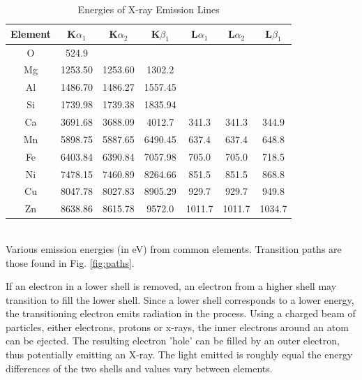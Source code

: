 \documentclass[10pt]{IEEEtran}
\begin{document}
\begin{table}[!hbt]
    \begin{center}
    \caption{Energies of X-ray Emission Lines}
    \label{tab:energies}
	\begin{tabular}{c|cccccc}
\hline 
Element & K$\alpha_1$ & K$\alpha_2$ & K$\beta_1$ & L$\alpha_1$ & L$\alpha_2$ & L$\beta_1$ \\ 
\hline 
O & 524.9 &   &  \\  
Mg & 1253.50 & 1253.60 & 1302.2 & & & \\  
Al & 1486.70 & 1486.27 & 1557.45 & & & \\  
Si & 1739.98 & 1739.38 & 1835.94 & & & \\  
Ca & 3691.68 & 3688.09 & 4012.7 & 341.3 & 341.3 & 344.9 \\ 
Mn & 5898.75 & 5887.65 & 6490.45 & 637.4 & 637.4 & 648.8 \\ 
Fe & 6403.84 & 6390.84 & 7057.98 & 705.0 & 705.0 & 718.5 \\ 
Ni & 7478.15 & 7460.89 & 8264.66 & 851.5 & 851.5 & 868.8 \\ 
Cu & 8047.78 & 8027.83 & 8905.29 & 929.7 & 929.7 & 949.8 \\ 
Zn & 8638.86 & 8615.78 & 9572.0 & 1011.7 & 1011.7 & 1034.7 \\ 
\hline
	\end{tabular}
	\medskip \\
    Various emission energies (in eV) from common elements\cite{xdb}. Transition paths are those found in Fig. \ref{fig:paths}.
	\end{center}
\end{table}

If an electron in a lower shell is removed, an electron from a higher shell may transition to fill the lower shell. Since a lower shell corresponds to a lower energy, the transitioning electron emits radiation in the process. Using a charged beam of particles, either electrons, protons or x-rays, the inner electrons around an atom can be ejected. The resulting electron 'hole' can be filled by an outer electron, thus potentially emitting an X-ray. The light emitted is roughly equal the energy differences of the two shells and values vary between elements.
\end{document}

